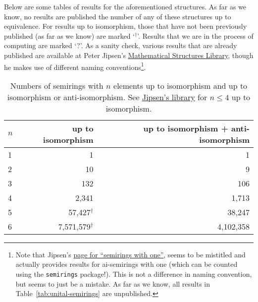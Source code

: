 \documentclass{article}
\theoremstyle{definition}
\begin{document}
Below are some tables of results for the aforementioned structures. As far as we know, no results are published the number of any of these structures up to equivalence. For results up to isomorphism, those that have not been previously published (as far as we know) are marked `$^\dagger$'. Results that we are in the process of computing are marked `?'. As a sanity check, various results that are already published are available at Peter Jipsen's \href{https://math.chapman.edu/~jipsen/structures/doku.php?id=start}{Mathematical Structures Library}, though he makes use of different naming conventions\footnote{Note that Jipsen's \href{https://math.chapman.edu/~jipsen/structures/doku.php?id=semirings_with_identity\#finite_members}{page for ``semirings with one''}, seems to be mistitled and actually provides results for ai-semirings with one (which can be counted using the \texttt{semirings} package!). This is not a difference in naming convention, but seems to just be a mistake. As far as we know, all results in Table~\ref{tab:unital-semirings} are unpublished.}.
\begin{table}[ht]
    \centering
    \begin{tabular}{l|r|r}
      \toprule
      $n$ & up to isomorphism & up to isomorphism + anti-isomorphism \\
      \midrule
      1 & 1         & 1         \\
      2 & 10        & 9         \\
      3 & 132       & 106       \\
      4 & 2,341     & 1,713     \\
      5 & 57,427$^\dagger$    & 38,247    \\
      6 & 7,571,579$^\dagger$  & 4,102,358 \\
    \end{tabular}
    \caption{Numbers of semirings with $n$ elements up to isomorphism and up
    to isomorphism or anti-isomorphism. See \href{https://math.chapman.edu/~jipsen/structures/doku.php?id=semirings\#finite_members}{Jipsen's library} for \(n\leq4\) up to isomorphism.}
    \label{tab:semirings}
\end{table}
\end{document}
